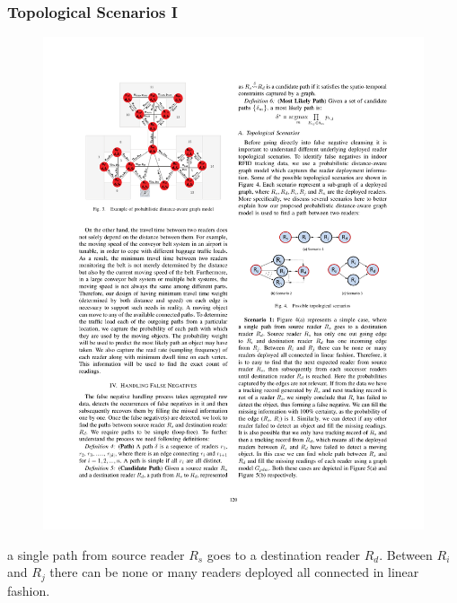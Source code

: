 \begin{frame}
\frametitle{Topological Scenarios I}

\begin{figure}[tb]
  \includegraphics[width=0.8\columnwidth]{figures/3-3/3-3-4.pdf}
\end{figure}

a single path from source reader $R_s$ goes to a destination reader $R_d$. Between $R_i$ and $R_j$ there can be none or many readers deployed all connected in linear fashion.

\end{frame}


